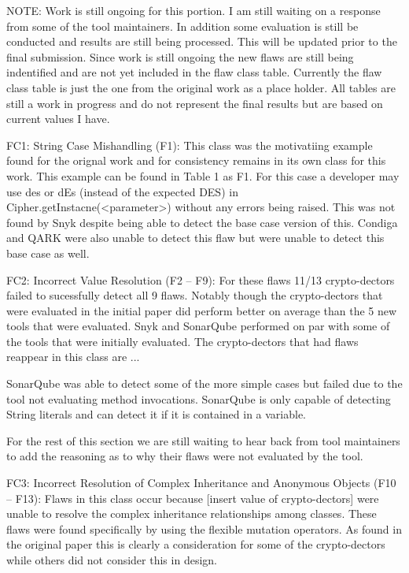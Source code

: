 NOTE: Work is still ongoing for this portion. I am still waiting on a response from some of the tool maintainers. In addition some evaluation is still be conducted and results are still being processed. This will be updated prior to the final submission. Since work is still ongoing the new flaws are still being indentified and are not yet included in the flaw class table. Currently the flaw class table is just the one from the original work as a place holder. All tables are still a work in progress and do not represent the final results but are based on current values I have.

FC1: String Case Mishandling (F1): This class was the motivatiing example found for the orignal work and for consistency remains in its own class for this work. This example can be found in Table 1 as F1. For this case a developer may use des or dEs (instead of the expected DES) in Cipher.getInstacne(<parameter>) without any errors being raised. This was not found by Snyk despite being able to detect the base case version of this. Condiga and QARK were also unable to detect this flaw but were unable to detect this base case as well.

FC2: Incorrect Value Resolution (F2 – F9): For these flaws 11/13 crypto-dectors failed to sucessfully detect all 9 flaws. Notably though the crypto-dectors that were evaluated in the initial paper did perform better on average than the 5 new tools that were evaluated. Snyk and SonarQube performed on par with some of the tools that were initially evaluated. The crypto-dectors that had flaws reappear in this class are ... 

SonarQube was able to detect some of the more simple cases but failed due to the tool not evaluating method invocations. SonarQube is only capable of detecting String literals and can detect it if it is contained in a variable. 

For the rest of this section we are still waiting to hear back from tool maintainers to add the reasoning as to why their flaws were not evaluated by the tool.

FC3: Incorrect Resolution of Complex Inheritance and Anonymous Objects (F10 – F13): Flaws in this class occur because [insert value of crypto-dectors] were unable to resolve the complex inheritance relationships among classes. These flaws were found specifically by using the flexible mutation operators. As found in the original paper this is clearly a consideration for some of the crypto-dectors while others did not consider this in design. 

